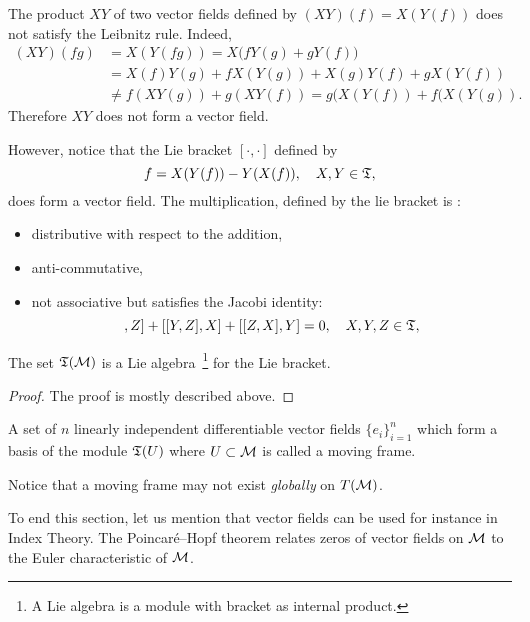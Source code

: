 The product $XY$ of two vector fields defined by $(XY)(f)=X(Y(f))$ does not satisfy the Leibnitz rule. Indeed, 
\[\begin{aligned}
(XY)(fg)&=X(Y(fg))=X\big(fY(g)+gY(f)\big)\\&=X(f)Y(g)+ fX(Y(g))+X(g)Y(f)+gX(Y(f))\\&\not=f(XY(g))+g(XY(f))=g(X(Y(f))+f(X(Y(g)).
\end{aligned}\]
Therefore $XY$ does not form a vector field.

However, notice that the Lie bracket  $[\cdot,\cdot]$ defined by
   \begin{equation}
[X,Y]f= X(Y(f))-Y(X(f)),\quad X,Y\in \fT,
 \end{equation}
does form a vector field. The multiplication, defined by the lie bracket is :

\begin{itemize}
\item distributive with respect to the addition,
\item anti-commutative,
\item not associative but satisfies the Jacobi identity: 
 \begin{equation}
[[X,Y],Z]+[[Y,Z],X]+[[Z,X],Y]=0,\quad X,Y,Z\in \fT,
 \end{equation}
 \end{itemize}
 
 \begin{lemma}
  The set $\mathfrak{T}(\mathcal{M})$ is a Lie algebra~\footnote{ A Lie algebra is a module  with bracket as internal product.} for the Lie bracket.
\end{lemma} 
\begin{proof}
The proof is mostly described above. \end{proof}

 \begin{definition}\label{D:Movfram}
 A set of $n$ linearly independent differentiable vector fields $\{e_{i}\}_{i=1}^{n }$ which form a basis of the module $ \mathfrak{T}(U)$ where $U\subset \mathcal{M}$ is called a moving frame.
 \end{definition}
 
Notice that a moving frame may not exist {\it globally} on $T(\mathcal{M})$.


To end this section, let us mention that vector fields can be used for instance in Index Theory. The Poincaré--Hopf theorem relates zeros of vector fields on $\mathcal{M}$ to the Euler characteristic of $\mathcal{M}$. 

